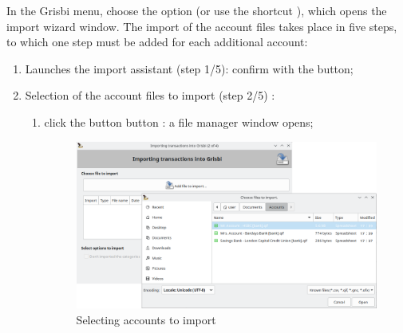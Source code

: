 In the Grisbi  menu, choose the option  (or use the shortcut ), which opens the import wizard window. The import of the account files takes place in five steps, to which one step must be added for each additional account:

\begin{enumerate}
	\item Launches the import assistant (step 1/5): confirm with the  button;
	\item Selection of the account files to import (step 2/5) :
		\begin{enumerate}
			\item click the button  button : a file manager window opens;
			\begin{figure}[htbp]
				\raggedleft
					\includegraphics[width=.95\textwidth]{image/screenshot/importexport_import_files_select}
				\caption{Selecting accounts to import}%
				\label{importexport-import-files-select-img}

\end{figure}
\end{enumerate}
\end{enumerate}
